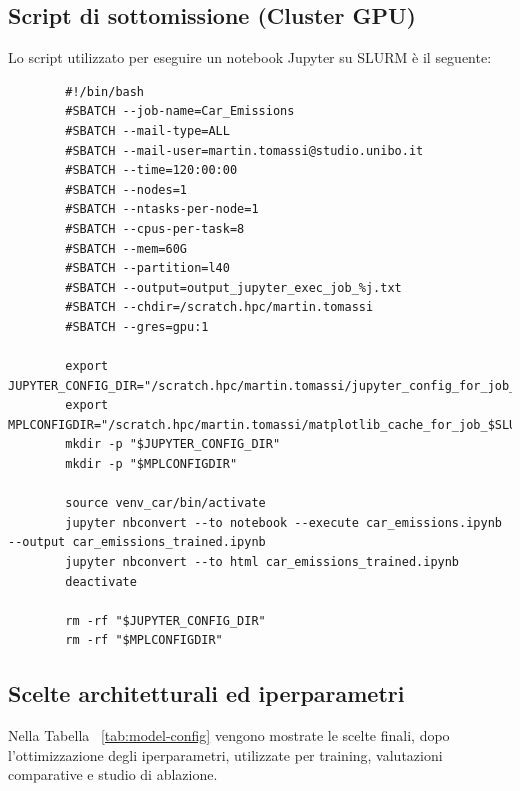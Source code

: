 \documentclass[a4paper,12pt]{report}
\begin{document}
	\subsection{Script di sottomissione (Cluster GPU)}
	Lo script utilizzato per eseguire un notebook Jupyter su SLURM è il seguente:
	
	\begin{verbatim}
		#!/bin/bash
		#SBATCH --job-name=Car_Emissions
		#SBATCH --mail-type=ALL
		#SBATCH --mail-user=martin.tomassi@studio.unibo.it
		#SBATCH --time=120:00:00
		#SBATCH --nodes=1
		#SBATCH --ntasks-per-node=1
		#SBATCH --cpus-per-task=8
		#SBATCH --mem=60G
		#SBATCH --partition=l40
		#SBATCH --output=output_jupyter_exec_job_%j.txt
		#SBATCH --chdir=/scratch.hpc/martin.tomassi
		#SBATCH --gres=gpu:1
		
		export JUPYTER_CONFIG_DIR="/scratch.hpc/martin.tomassi/jupyter_config_for_job_$SLURM_JOB_ID"
		export MPLCONFIGDIR="/scratch.hpc/martin.tomassi/matplotlib_cache_for_job_$SLURM_JOB_ID"
		mkdir -p "$JUPYTER_CONFIG_DIR"
		mkdir -p "$MPLCONFIGDIR"
		
		source venv_car/bin/activate
		jupyter nbconvert --to notebook --execute car_emissions.ipynb --output car_emissions_trained.ipynb
		jupyter nbconvert --to html car_emissions_trained.ipynb
		deactivate
		
		rm -rf "$JUPYTER_CONFIG_DIR"
		rm -rf "$MPLCONFIGDIR"
	\end{verbatim}
	
	\subsection{Scelte architetturali ed iperparametri}
	Nella Tabella ~\ref{tab:model-config} vengono mostrate le scelte finali, dopo l'ottimizzazione degli iperparametri, utilizzate per training, valutazioni comparative e studio di ablazione.
	
\end{document}
